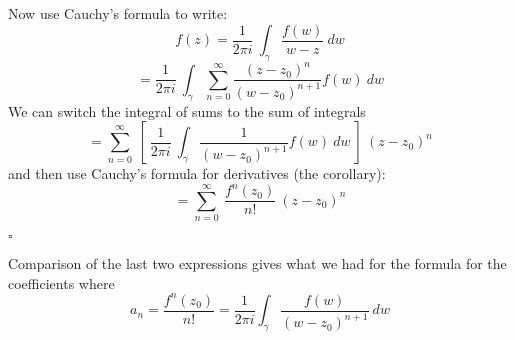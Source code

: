 \documentclass[11pt, oneside]{article}
\begin{document}
Now use Cauchy's formula to write:
\[ f(z) = \frac{1}{2 \pi i} \ \int_{\gamma} \frac{f(w)}{w - z} \ dw \]
\[ = \frac{1}{2 \pi i} \ \int_{\gamma} \sum_{n=0}^{\infty} \frac{(z - z_0)^n}{(w - z_0)^{n+1}} f(w) \ dw \] 
We can switch the integral of sums to the sum of integrals
\[ = \sum_{n=0}^{\infty} \ [ \ \frac{1}{2 \pi i} \ \int_{\gamma} \frac{1}{(w - z_0)^{n+1}} f(w) \ dw \ ]  \ (z - z_0)^n \] 
and then use Cauchy's formula for derivatives (the corollary):
\[ = \sum_{n=0}^{\infty} \ \frac{f^n(z_0)}{n!} \ (z - z_0)^n \]

$\square$

Comparison of the last two expressions gives what we had for the formula for the coefficients where 
\[ a_n = \frac{f^n(z_0)}{n!} = \frac{1}{2 \pi i} \int_{\gamma} \frac{f(w)}{(w - z_0)^{n+1}} \ dw \]
\end{document}
